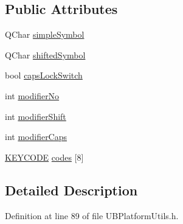 \subsection*{Public Attributes}
\begin{DoxyCompactItemize}
\item 
Q\-Char \hyperlink{struct_k_e_y_b_t_a4dddfb1bdd8b6a673aba8ea54fbea59a}{simple\-Symbol}
\item 
Q\-Char \hyperlink{struct_k_e_y_b_t_a7c886876aa3096f3bbcd725e1577483f}{shifted\-Symbol}
\item 
bool \hyperlink{struct_k_e_y_b_t_ab4ca415bd57f97a60915a2af06c75958}{caps\-Lock\-Switch}
\item 
int \hyperlink{struct_k_e_y_b_t_aed3283c14d3f745f7e0a41b319c0781c}{modifier\-No}
\item 
int \hyperlink{struct_k_e_y_b_t_af06d0f98f70310acf5a2ecd97b261f1a}{modifier\-Shift}
\item 
int \hyperlink{struct_k_e_y_b_t_a84296145483528534a88d1baa1c09727}{modifier\-Caps}
\item 
\hyperlink{struct_k_e_y_c_o_d_e}{K\-E\-Y\-C\-O\-D\-E} \hyperlink{struct_k_e_y_b_t_a198ae305b41a3b0a5a571a475f448c5d}{codes} \mbox{[}8\mbox{]}
\end{DoxyCompactItemize}


\subsection{Detailed Description}


Definition at line 89 of file U\-B\-Platform\-Utils.\-h.




